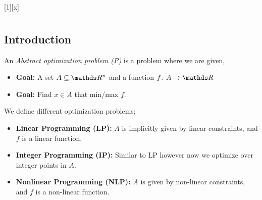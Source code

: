 \documentclass[11pt,oneside]{book} %
\begin{document}
	\renewcommand*{\term}{Term 2000} %
	\renewcommand*{\coursecode}{MATH 000} %
	\renewcommand*{\coursename}{Course Name} %
	\renewcommand*{\profname}{Prof Name} %
	\renewcommand*{\colink}{http://www.student.math.uwaterloo.ca/~c2kent} %
	\setfigpath
	\pagestyle{plain}
	\clearpage
	\pagestyle{chapterlecture}
	[x]
		\chapter{\chapname\chaplec}
		\section{Introduction}
		\begin{defn*}
			An \emph{Abstract optimization problem (P)} is a problem where we are given,
			\begin{itemize}
				\item \textbf{Goal: }A set $A\subseteq \R^n$ and a function $f \colon A \rightarrow \R$
				\item \textbf{Goal: }Find $x\in A$ that min/max $f$.
			\end{itemize}
		\end{defn*}
		\begin{defn*}
			We define different optimization problems;
			\begin{itemize}
				\item \textbf{Linear Programming (LP): } $A$ is implicitly given by linear constraints, and $f$ is a linear function.
				\item \textbf{Integer Programming (IP): } Similar to LP however now we optimize over integer points in $A$.
				\item \textbf{Nonlinear Programming (NLP): } $A$ is given by non-linear constraints, and $f$ is a non-linear function.
			\end{itemize}
		\end{defn*}
\end{document}
